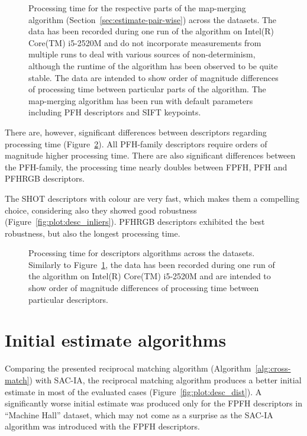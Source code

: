 \begin{figure}
  \centering
  
  \caption[Processing time per algorithm parts]{Processing time for the respective parts of the map-merging algorithm (Section~\ref{sec:estimate-pair-wise}) across the datasets. The data has been recorded during one run of the algorithm on Intel(R) Core(TM) i5-2520M and do not incorporate measurements from multiple runs to deal with various sources of non-determinism, although the runtime of the algorithm has been observed to be quite stable. The data are intended to show order of magnitude differences of processing time between particular parts of the algorithm. The map-merging algorithm has been run with default parameters including \gls{PFH} descriptors and \gls{SIFT} keypoints.}
  \label{fig:plot:perf}
\end{figure}

There are, however, significant differences between descriptors regarding processing time (Figure~\ref{fig:plot:desc_perf}). All \gls{PFH}-family descriptors require orders of magnitude higher processing time. There are also significant differences between the \gls{PFH}-family, the processing time nearly doubles between \gls{FPFH}, \gls{PFH} and \gls{PFHRGB} descriptors.

The \gls{SHOT} descriptors with colour are very fast, which makes them a compelling choice, considering also they showed good robustness (Figure~\ref{fig:plot:desc_inliers}). \gls{PFHRGB} descriptors exhibited the best robustness, but also the longest processing time.

\begin{figure}
  \centering
  
  \caption[Processing time per descriptors]{Processing time for descriptors algorithms across the datasets. Similarly to Figure~\ref{fig:plot:perf}, the data has been recorded during one run of the algorithm on Intel(R) Core(TM) i5-2520M and are intended to show order of magnitude differences of processing time between particular descriptors.}
  \label{fig:plot:desc_perf}
\end{figure}

\section{Initial estimate algorithms}
\label{sec:initial-estimate-algorithms}

Comparing the presented reciprocal matching algorithm (Algorithm~\ref{alg:cross-match}) with \gls{SAC-IA}, the reciprocal matching algorithm produces a better initial estimate in most of the evaluated cases (Figure~\ref{fig:plot:desc_dist}). A significantly worse initial estimate was produced only for the \gls{FPFH} descriptors in ``Machine Hall'' dataset, which may not come as a surprise as the \gls{SAC-IA} algorithm was introduced with the \gls{FPFH} descriptors.

